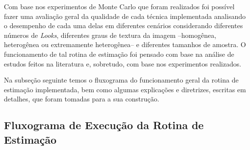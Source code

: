 Com base nos experimentos de Monte Carlo que foram realizados foi possível fazer uma avaliação geral da qualidade de cada técnica implementada analisando o desempenho de cada uma delas em diferentes cenários considerando diferentes números de \textit{Looks}, diferentes graus de textura da imagem --homogênea, heterogênea ou extremamente heterogênea-- e diferentes tamanhos de amostra. 
O funcionamento de tal rotina de estimação foi pensado com base na análise de estudos feitos na literatura e, sobretudo, com base nos experimentos realizados.

Na subseção seguinte temos o fluxograma do funcionamento geral da rotina de estimação implementada, bem como algumas explicações e diretrizes, escritas em detalhes, que foram tomadas para a sua construção. 

\subsection{Fluxograma de Execução da Rotina de Estimação}

